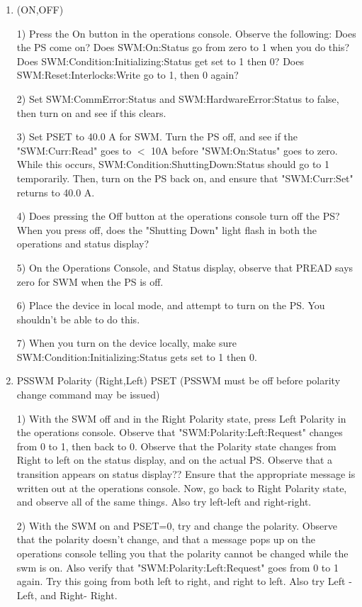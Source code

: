 \documentclass[11pt]{book}		%
\begin{document}
\begin{enumerate}

 \item (ON,OFF)

\color{red}
1) Press the On button in the operations console. Observe the following: 
	Does the PS come on? 
	Does SWM:On:Status go from zero to 1 when you do this? 
	Does SWM:Condition:Initializing:Status get set to 1 then 0?
	Does SWM:Reset:Interlocks:Write go to 1, then 0 again?

2) Set SWM:CommError:Status and SWM:HardwareError:Status to false, then turn on and see if this clears.

3) Set PSET to 40.0 A for SWM. Turn the PS off, and see if the "SWM:Curr:Read" goes to $<$ 10A before "SWM:On:Status" goes to zero. While this occurs, SWM:Condition:ShuttingDown:Status should go to 1 temporarily. Then, turn on the PS back on, and ensure that "SWM:Curr:Set" returns to 40.0 A.

4) Does pressing the Off button at the operations console turn off the PS? When you press off, does the "Shutting Down" light flash in both the operations and status display?

5) On the Operations Console, and Status display, observe that PREAD says zero for SWM when the PS is off.

6) Place the device in local mode, and attempt to turn on the PS. You shouldn't be able to do this.

7) When you turn on the device locally, make sure SWM:Condition:Initializing:Status gets set to 1 then 0.


\color{black}


\item PSSWM Polarity (Right,Left) PSET (PSSWM must be off before polarity change command may be issued)


\color{red}

1) With the SWM off and in the Right Polarity state, press Left Polarity in the operations console. Observe that "SWM:Polarity:Left:Request" changes from 0 to 1, then back to 0. Observe that the Polarity state changes from Right to left on the status display, and on the actual PS. Observe that a transition appears on status display?? Ensure that the appropriate message is written out at the operations console. Now, go back to Right Polarity state, and observe all of the same things. Also try left-left and right-right.

2) With the SWM on and PSET=0, try and change the polarity. Observe that the polarity doesn't change, and that a message pops up on the operations console telling you that the polarity cannot be changed while the swm is on. Also verify that "SWM:Polarity:Left:Request" goes from 0 to 1 again. Try this going from both left to right, and right to left. Also try Left - Left, and Right- Right.



\end{enumerate}
\end{document}
